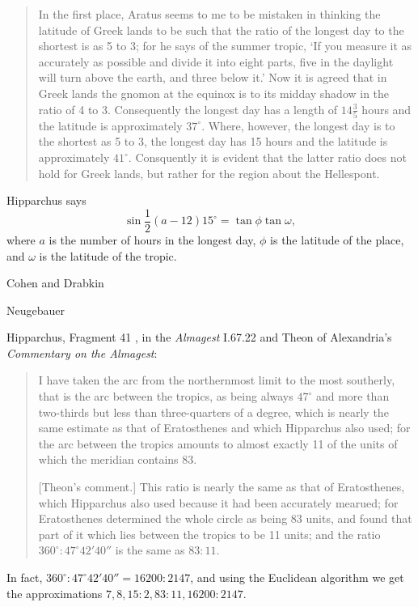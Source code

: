 \documentclass{article}
\theoremstyle{definition}
\begin{document}
\begin{quote}
In the first place, Aratus seems to me to be mistaken in thinking the latitude of Greek lands to be such that
the ratio of the longest day to the shortest is as 5 to 3; for he says of the summer tropic, `If you measure it as accurately
as possible and divide it into eight parts, five in the daylight will turn above the earth, and three below it.' Now it is
agreed that in Greek lands the gnomon at the equinox is to its midday shadow in the ratio of 4 to 3. Consequently the 
longest day has a length of $14 \frac{3}{5}$ hours and the latitude is approximately $37^\circ$. Where, however,
the longest day is to the shortest as 5 to 3, the longest day has 15 hours and the latitude is approximately $41^\circ$.
Consquently it is evident that the latter ratio does not hold for Greek lands, but rather for the region about the
Hellespont.
\end{quote} 


Hipparchus says
\[
\sin \frac{1}{2}(a-12) 15^\circ = \tan \phi \tan \omega,
\]
where $a$ is the number of hours in the longest day, $\phi$ is the latitude of the place, and $\omega$
is the latitude of the tropic.

Cohen and Drabkin \cite[pp.~82--86]{drabkin}


Neugebauer \cite{HAMA}

Hipparchus, Fragment 41 \cite[p.~91]{dicks}, in the {\em Almagest} I.67.22 and Theon of Alexandria's
{\em Commentary on the Almagest}:

\begin{quote}
I have taken the arc from the northernmost limit to the most southerly, that is the arc between the tropics, as being always $47^\circ$ and more than two-thirds
but less than three-quarters of a degree, which is nearly the same estimate as that of Eratosthenes and which Hipparchus also used; for the arc between the tropics
amounts to almost exactly 11 of the units of which the meridian contains 83.

[Theon's comment.] This ratio is nearly the same as that of Eratosthenes, which Hipparchus also used because it had been accurately mearued; for Eratosthenes determined
the whole circle as being 83 units, and found that part of it which lies between the tropics to be 11 units; and the ratio $360^\circ: 47^\circ 42' 40''$ is the same as $83:11$.
\end{quote}

In fact, $360^\circ: 47^\circ 42' 40'' = 16200:2147$, and using the Euclidean algorithm we get the approximations $7,8,15:2,
83:11,16200:2147$. 
\end{document}
